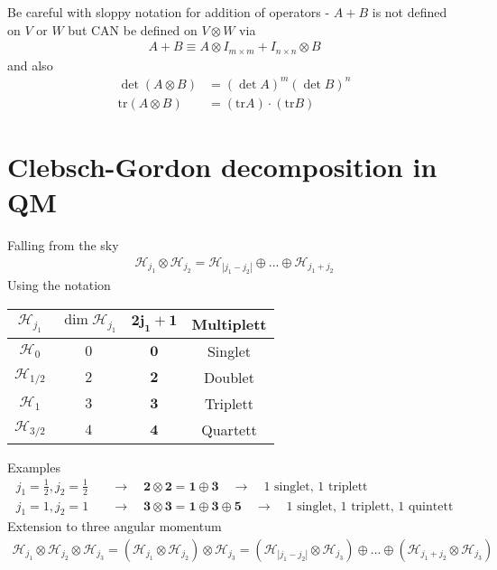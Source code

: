 \documentclass[../main.tex]{subfiles}
\begin{document}
Be careful with sloppy notation for addition of operators - $A+B$ is not defined on $V$ or $W$ but CAN be defined on $V\otimes W$ via
\begin{align}
A+B\equiv A\otimes I_{m\times m} + I_{n\times n}\otimes B
\end{align}
and also
\begin{align}
\det(A\otimes B)&=(\det A)^m(\det B)^n\\
\text{tr}(A\otimes B)&=(\text{tr} A)\cdot(\text{tr} B)
\end{align}


\section{Clebsch-Gordon decomposition in QM}
Falling from the sky
\begin{align}
\mathcal{H}_{j_1}\otimes\mathcal{H}_{j_2}
=\mathcal{H}_{|j_1-j_2|}\oplus...\oplus\mathcal{H}_{j_1+j_2}
\end{align}
Using the notation 
\begin{center}
\begin{tabular}{cccc}
$\mathcal{H}_{j_1}$ & $\dim{\mathcal{H}_{j_1}}$ & $\mathbf{2j_1+1}$ & Multiplett\\ \hline
$\mathcal{H}_{0}$ & $0$ & $\mathbf{0}$ & Singlet\\
$\mathcal{H}_{1/2}$ & $2$ & $\mathbf{2}$ & Doublet\\
$\mathcal{H}_{1}$ & $3$ & $\mathbf{3}$ & Triplett\\
$\mathcal{H}_{3/2}$ & $4$ & $\mathbf{4}$ & Quartett
\end{tabular}
\end{center}
Examples
\begin{align}
j_1=\frac{1}{2}, j_2=\frac{1}{2}\quad&\rightarrow\quad\mathbf{2}\otimes\mathbf{2}=\mathbf{1}\oplus\mathbf{3}
\quad\rightarrow\quad \text{1 singlet, 1 triplett}\\
j_1=1, j_2=1\quad&\rightarrow\quad\mathbf{3}\otimes\mathbf{3}=\mathbf{1}\oplus\mathbf{3}\oplus\mathbf{5}
\quad\rightarrow\quad \text{1 singlet, 1 triplett, 1 quintett}
\end{align}
Extension to three angular momentum
\begin{align}
\mathcal{H}_{j_1}\otimes\mathcal{H}_{j_2}\otimes\mathcal{H}_{j_3}
=(\mathcal{H}_{j_1}\otimes\mathcal{H}_{j_2})\otimes\mathcal{H}_{j_3}
=(\mathcal{H}_{|j_1-j_2|}\otimes\mathcal{H}_{j_3})\oplus...\oplus(\mathcal{H}_{j_1+j_2}\otimes\mathcal{H}_{j_3})
\end{align}
\end{document}
